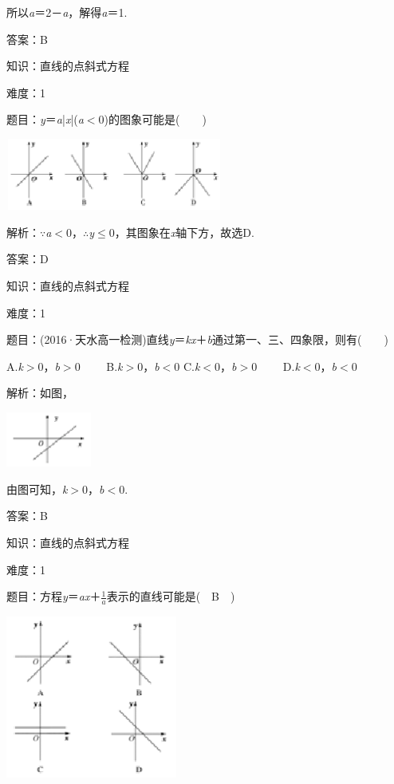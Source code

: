 \documentclass{article} %
\begin{document}
所以\textit{a}＝2－\textit{a}，解得\textit{a}＝1.

答案：B

知识：直线的点斜式方程

难度：1

题目：\textit{y}＝\textit{a}|\textit{x}|(\textit{a}$\mathrm{<}$0)的图象可能是(　　)

\includegraphics*[width=2.81in, height=0.93in, keepaspectratio=false]{image276}

解析：$\mathrm{\because}$\textit{a}$\mathrm{<}$0，$\mathrm{\therefore}$\textit{y}$\mathrm{\le}$0，其图象在\textit{x}轴下方，故选D.

答案：D

知识：直线的点斜式方程

难度：1

题目：(2016·天水高一检测)直线\textit{y}＝\textit{kx}＋\textit{b}通过第一、三、四象限，则有(　　)

A.\textit{k}$\mathrm{>}$0，\textit{b}$\mathrm{>}$0　　 B.\textit{k}$\mathrm{>}$0，\textit{b}$\mathrm{<}$0 C.\textit{k}$\mathrm{<}$0，\textit{b}$\mathrm{>}$0　　 D.\textit{k}$\mathrm{<}$0，\textit{b}$\mathrm{<}$0

解析：如图，

\includegraphics*[width=1.10in, height=0.71in, keepaspectratio=false]{image277}

由图可知，\textit{k}$\mathrm{>}$0，\textit{b}$\mathrm{<}$0.

答案：B

知识：直线的点斜式方程

难度：1

题目：方程\textit{y}＝\textit{ax}＋$\frac{1}{a}$表示的直线可能是(　B　)

\includegraphics*[width=2.22in, height=2.13in, keepaspectratio=false]{image278}
\end{document}
